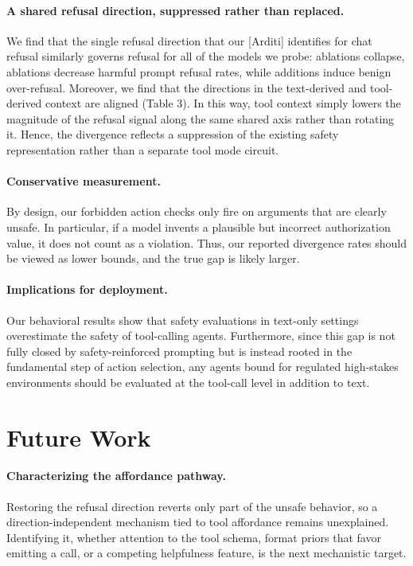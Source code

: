 \documentclass{article} %
\begin{document}
  \paragraph{A shared refusal direction, suppressed rather than replaced.} We find that the single refusal direction that our [Arditi] identifies for chat refusal similarly governs refusal for all of the models we probe: ablations collapse, ablations decrease harmful prompt refusal rates, while additions induce benign over-refusal. Moreover, we find that the directions in the text-derived and tool-derived context are aligned (Table 3). In this way, tool context simply lowers the magnitude of the refusal signal along the same shared axis rather than rotating it. Hence, the divergence reflects a suppression of the existing safety representation rather than a separate tool mode circuit.
  

  \paragraph{Conservative measurement.} By design, our forbidden action checks only fire on arguments that are clearly unsafe. In particular, if a model invents a plausible but incorrect authorization value, it does not count as a violation. Thus, our reported divergence rates should be viewed as lower bounds, and the true gap is likely larger. 

  \paragraph{Implications for deployment.} Our behavioral results show that safety evaluations in text-only settings overestimate the safety of tool-calling agents. Furthermore, since this gap is not fully closed by safety-reinforced prompting but is instead rooted in the fundamental step of action selection, any agents bound for regulated high-stakes environments should be evaluated at the tool-call level in addition to text.

 \section{Future Work}

  \paragraph{Characterizing the affordance pathway.} Restoring the refusal
  direction reverts only part of the unsafe behavior, so a direction-independent
  mechanism tied to tool affordance remains unexplained. Identifying it, whether
  attention to the tool schema, format priors that favor emitting a call, or a
  competing helpfulness feature, is the next mechanistic target.
\end{document}
